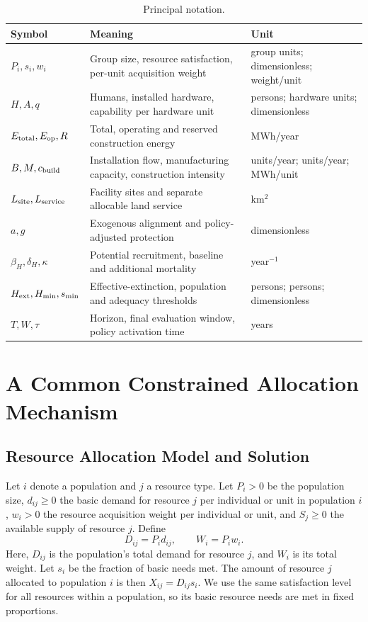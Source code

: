 \documentclass[12pt,a4paper]{article}
\theoremstyle{remark}
\begin{document}
\begin{table}[!htb]\centering\small
\caption{Principal notation.}\label{tab:notation}
\begin{tabularx}{\linewidth}{@{}lXl@{}}\toprule
Symbol & Meaning & Unit\\\midrule
$P_i,s_i,w_i$ & Group size, resource satisfaction, per-unit acquisition weight & group units; dimensionless; weight/unit\\
$H,A,q$ & Humans, installed hardware, capability per hardware unit & persons; hardware units; dimensionless\\
$E_{\rm total},E_{\rm op},R$ & Total, operating and reserved construction energy & MWh/year\\
$B,M,c_{\rm build}$ & Installation flow, manufacturing capacity, construction intensity & units/year; units/year; MWh/unit\\
$L_{\rm site},L_{\rm service}$ & Facility sites and separate allocable land service & km$^2$\\
$a,g$ & Exogenous alignment and policy-adjusted protection & dimensionless\\
$\beta_H,\delta_H,\kappa$ & Potential recruitment, baseline and additional mortality & year$^{-1}$\\
$H_{\rm ext},H_{\min},s_{\min}$ & Effective-extinction, population and adequacy thresholds & persons; persons; dimensionless\\
$T,W,\tau$ & Horizon, final evaluation window, policy activation time & years\\
\bottomrule
\end{tabularx}
\end{table}


\section{A Common Constrained Allocation Mechanism}\label{sec:allocation}
\subsection{Resource Allocation Model and Solution}
Let $i$ denote a population and $j$ a resource type. Let $P_i>0$ be the population size, $d_{ij}\ge0$ the basic demand for resource $j$ per individual or unit in population $i$, $w_i>0$ the resource acquisition weight per individual or unit, and $S_j\ge0$ the available supply of resource $j$. Define
\[
D_{ij}=P_id_{ij},\qquad W_i=P_iw_i.
\]
Here, $D_{ij}$ is the population's total demand for resource $j$, and $W_i$ is its total weight. Let $s_i$ be the fraction of basic needs met. The amount of resource $j$ allocated to population $i$ is then $X_{ij}=D_{ij}s_i$. We use the same satisfaction level for all resources within a population, so its basic resource needs are met in fixed proportions.
\end{document}
